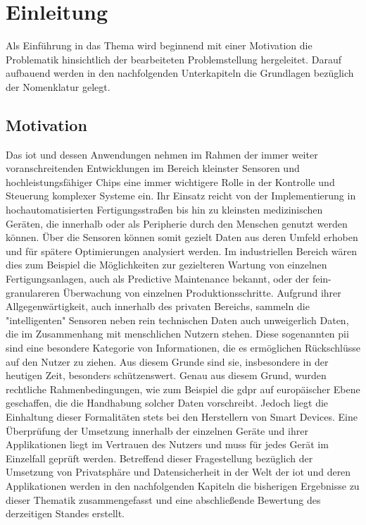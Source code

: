 
\section{Einleitung}
\label{sec:Einleitung}
Als Einführung in das Thema wird beginnend mit einer Motivation die Problematik hinsichtlich der bearbeiteten Problemstellung hergeleitet. Darauf aufbauend werden in den nachfolgenden Unterkapiteln die Grundlagen bezüglich der Nomenklatur gelegt.

\subsection{Motivation}
\label{sec:Einleitung:ssec:Motivation}
\noindent
Das \ac{iot} und dessen Anwendungen nehmen im Rahmen der immer weiter voranschreitenden Entwicklungen im Bereich kleinster Sensoren und hochleistungsfähiger Chips eine immer wichtigere Rolle in der Kontrolle und Steuerung komplexer Systeme ein. 
Ihr Einsatz reicht von der Implementierung in hochautomatisierten Fertigungsstraßen bis hin zu kleinsten medizinischen Geräten, die innerhalb oder als Peripherie durch den Menschen genutzt werden können. Über die Sensoren können somit gezielt Daten aus deren Umfeld erhoben und für spätere Optimierungen analysiert werden. Im industriellen Bereich wären dies zum Beispiel die Möglichkeiten zur gezielteren Wartung von einzelnen Fertigungsanlagen, auch als Predictive Maintenance bekannt, oder der fein-granulareren Überwachung von einzelnen Produktionsschritte. 
Aufgrund ihrer Allgegenwärtigkeit, auch innerhalb des privaten Bereichs, sammeln die "intelligenten" Sensoren neben rein technischen Daten auch unweigerlich Daten, die im Zusammenhang mit menschlichen Nutzern stehen. Diese sogenannten \ac{pii} sind eine besondere Kategorie von Informationen, die es ermöglichen Rückschlüsse auf den Nutzer zu ziehen. Aus diesem Grunde sind sie, insbesondere in der heutigen Zeit, besonders schützenswert.
Genau aus diesem Grund, wurden rechtliche Rahmenbedingungen, wie zum Beispiel die \ac{gdpr} auf europäischer Ebene geschaffen, die die Handhabung solcher Daten vorschreibt. Jedoch liegt die Einhaltung dieser Formalitäten stets bei den Herstellern von Smart Devices. Eine Überprüfung der Umsetzung innerhalb der einzelnen Geräte und ihrer Applikationen liegt im Vertrauen des Nutzers und muss für jedes Gerät im Einzelfall geprüft werden.
Betreffend dieser Fragestellung bezüglich der Umsetzung von Privatsphäre und Datensicherheit in der Welt der \acs{iot} und deren Applikationen werden in den nachfolgenden Kapiteln die bisherigen Ergebnisse zu dieser Thematik zusammengefasst und eine abschließende Bewertung des derzeitigen Standes erstellt.

